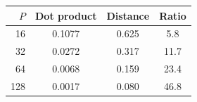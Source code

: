 \begin{tabular}{rccc}
\toprule
$P$ & Dot product & Distance & Ratio \\
\midrule
16 & 0.1077 & 0.625 & 5.8 \\
32 & 0.0272 & 0.317 & 11.7 \\
64 & 0.0068 & 0.159 & 23.4 \\
128 & 0.0017 & 0.080 & 46.8 \\
\bottomrule
\end{tabular}
